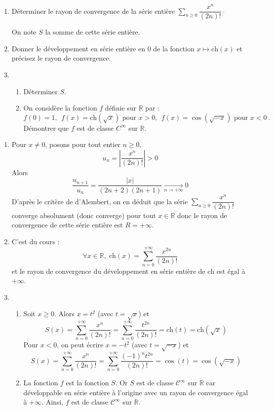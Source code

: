 \documentclass[a4paper,10pt]{report}
\newcommand{\Sum}[2]{\ensuremath{\textstyle{\sum\limits_{#1}^{#2}}}}
\begin{document}
\begin{Exercice}{} \begin{enumerate}
\item Déterminer le rayon de convergence de la série entière $\Sum{n \geq 0}{} \dfrac{x^n}{(2n)!} \cdot$

\noindent On note $S$ la somme de cette série entière.
\item Donner le développement en série entière en 0 de la fonction $x\mapsto \text{ch}(x)$  et précisez le rayon de convergence.
\item \begin{enumerate}
	\item Déterminer $S$.
	\item On considère la fonction $f$ définie sur $\mathbb{R}$ par :
	\begin{equation*}
	f(0)=1,\ \ f(x)=\text{ch}(\sqrt x)\text{ pour $x>0$},\ \ f(x)=\cos(\sqrt{-x})\text{ pour $x<0$}\ .
	\end{equation*}
	Démontrer que $f$ est de classe $C^{\infty}$ sur $\mathbb{R}$.
	\end{enumerate}
\end{enumerate}
\end{Exercice}

\corr \begin{enumerate}
\item Pour $x \neq 0$, posons  pour tout entier $n \geq 0$,
 $$u_n  = \left\vert \dfrac{x^n }{(2n)!} \right\vert > 0$$
Alors
$$ \dfrac{u_{n+1}}{u_n} = \dfrac{ \vert x \vert }{(2n+2)(2n+1)} \underset{n \rightarrow + \infty}{\longrightarrow} 0$$
D'après le critère de d'Alembert, on en déduit que la série $\Sum{n \geq 0}{} {\dfrac{{x^n }}{{(2n)!}}} $ converge absolument (donc converge) pour tout $x \in \mathbb{R}$ donc le rayon de convergence de cette série entière est $R =  + \infty $.
\item C'est du cours :
$$\forall x\in \mathbb{R} , \; \textrm{ch} (x) = \displaystyle\sum\limits_{n = 0}^{ + \infty } {\dfrac{{x^{2n} }}{{(2n)!}}} $$ 
et le rayon de convergence du développement en série entière de $\textrm{ch}$  est égal à $ + \infty $.
\item 
\begin{enumerate}
\item Soit $x \geq 0$. Alors $x= t^2$ (avec $t = \sqrt{x}$) et 
$$S(x) = \displaystyle\sum\limits_{n = 0}^{ + \infty } {\dfrac{{x^n }}{{(2n)!}}}  = \displaystyle\sum\limits_{n = 0}^{ + \infty } {\dfrac{{t^{2n} }}{{(2n)!}}}  = \textrm{ch} (t) = \textrm{ch}( \sqrt x) $$
Pour $x < 0$, on peut écrire $x =  - t^2 $ (avec $t=\sqrt{-x}$) et 
$$S(x) = \displaystyle\sum\limits_{n = 0}^{ + \infty } {\dfrac{{x^n }}{{(2n)!}}}  = \displaystyle\sum\limits_{n = 0}^{ + \infty } {\dfrac{{( - 1)^n t^{2n} }}{{(2n)!}}}  = \cos (t) = \cos (\sqrt { - x}) $$
\item La fonction $f$ est la fonction $S$. Or $S$ est  de classe $\mathcal{C}^\infty $ sur $\mathbb{R}$ car développable en série entière à l'origine avec un rayon de convergence égal à $+\infty$. Ainsi, $f$ est  de classe $\mathcal{C}^\infty  $ sur $\mathbb{R}$.
\end{enumerate}
\end{enumerate}
\end{document}
